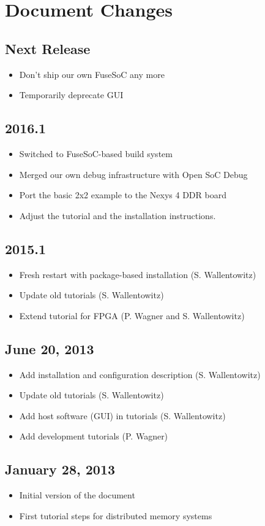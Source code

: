 \section*{Document Changes}


\subsection*{Next Release}
\begin{itemize}
\item Don't ship our own FuseSoC any more
\item Temporarily deprecate GUI
\end{itemize}

\subsection*{2016.1}
\begin{itemize}
\item Switched to FuseSoC-based build system
\item Merged our own debug infrastructure with Open SoC Debug
\item Port the basic 2x2 example to the Nexys 4 DDR board
\item Adjust the tutorial and the installation instructions.
\end{itemize}

\subsection*{2015.1}
\begin{itemize}
\item Fresh restart with package-based installation (S. Wallentowitz)
\item Update old tutorials (S. Wallentowitz)
\item Extend tutorial for FPGA (P. Wagner and S. Wallentowitz)
\end{itemize}

\subsection*{June 20, 2013}
\begin{itemize}
\item Add installation and configuration description (S. Wallentowitz)
\item Update old tutorials (S. Wallentowitz)
\item Add host software (GUI) in tutorials (S. Wallentowitz)
\item Add development tutorials (P. Wagner)
\end{itemize}

\subsection*{January 28, 2013}
\begin{itemize}
\item Initial version of the document
\item First tutorial steps for distributed memory systems
\end{itemize}
